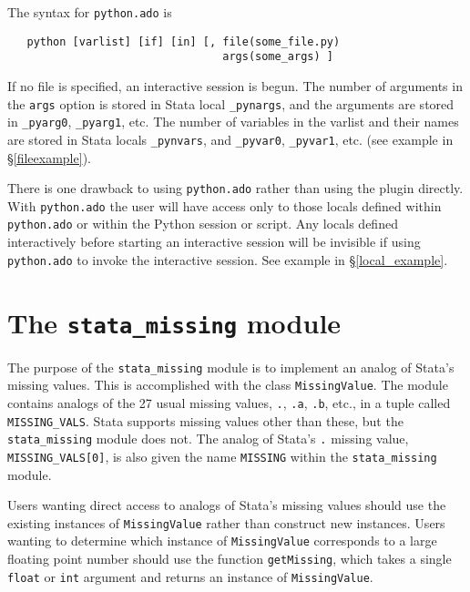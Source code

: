 \documentclass{article}
\begin{document}
	The syntax for \lstinline$python.ado$ is
	\begin{lstlisting}
   python [varlist] [if] [in] [, file(some_file.py) 
                                 args(some_args) ]
  \end{lstlisting}
  
  If no file is specified, an interactive session is begun. The number of arguments in the \lstinline{args} option is stored in Stata local \lstinline$_pynargs$, and the arguments are stored in \lstinline$_pyarg0$, \lstinline$_pyarg1$, etc. The number of variables in the varlist and their names are stored in Stata locals \lstinline$_pynvars$, and \lstinline$_pyvar0$, \lstinline$_pyvar1$, etc. (see example in \S\ref{fileexample}).
		
		There is one drawback to using \lstinline$python.ado$ rather than using the plugin directly. With  \lstinline$python.ado$ the user will have access only to those locals defined within \lstinline$python.ado$ or within the Python session or script. Any locals defined interactively before starting an interactive session will be invisible if using \lstinline$python.ado$ to invoke the interactive session. See example in \S\ref{local_example}.
		

\section{The \lstinline$stata_missing$ module} \label{stata_missing}

	The purpose of the \lstinline$stata_missing$ module is to implement an analog of Stata's missing values. This is accomplished with the class \lstinline$MissingValue$. The module contains analogs of the 27 usual missing values, \lstinline$.$, \lstinline$.a$, \lstinline$.b$, etc., in a tuple called \lstinline$MISSING_VALS$. Stata supports missing values other than these, but the \lstinline$stata_missing$ module does not. The analog of Stata's \lstinline$.$ missing value, \lstinline$MISSING_VALS[0]$, is also given the name \lstinline$MISSING$ within the \lstinline$stata_missing$ module.
		
	Users wanting direct access to analogs of Stata's missing values should use the existing instances of \lstinline$MissingValue$ rather than construct new instances. Users wanting to determine which instance of \lstinline$MissingValue$ corresponds to a large floating point number should use the function \lstinline$getMissing$, which takes a single \lstinline{float} or \lstinline{int} argument and returns an instance of \lstinline{MissingValue}. 
	
\end{document}
